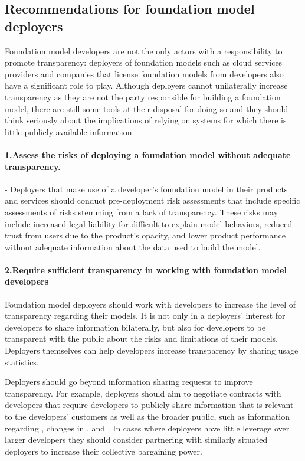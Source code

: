 \hypertarget{recommendations-deployers}{\subsection{Recommendations for foundation model deployers}}
\label{sec:recommendations-deployers}
Foundation model developers are not the only actors with a responsibility to promote transparency: deployers of foundation models such as cloud services providers and companies that license foundation models from developers also have a significant role to play. 
Although deployers cannot unilaterally increase transparency as they are not the party responsible for building a foundation model, there are still some tools at their disposal for doing so and they should think seriously about the implications of relying on systems for which there is little publicly available information. 

\paragraph{1.\phantom{X}Assess the risks of deploying a foundation model without adequate transparency.} 
-  Deployers that make use of a developer's foundation model in their products and services should conduct pre-deployment risk assessments that include specific assessments of risks stemming from a lack of transparency. These risks may include increased legal liability for difficult-to-explain model behaviors, reduced trust from users due to the product's opacity, and lower product performance without adequate information about the data used to build the model.
 \paragraph{2.\phantom{X}Require sufficient transparency in working with foundation model developers} 
\begin{myitemize}
\item Foundation model deployers should work with developers to increase the level of transparency regarding their models. 
It is not only in a deployers' interest for developers to share information bilaterally, but also for developers to be transparent with the public about the risks and limitations of their models. 
Deployers themselves can help developers increase transparency by sharing usage statistics.
\item Deployers should go beyond information sharing requests to improve transparency. 
For example, deployers should aim to negotiate contracts with developers that require developers to publicly share information that is relevant to the developers' customers as well as the broader public, such as information regarding \updates, changes in \usagepolicy, and \impact. 
In cases where deployers have little leverage over larger developers they should consider partnering with similarly situated deployers to increase their collective bargaining power. 
\end{myitemize}
